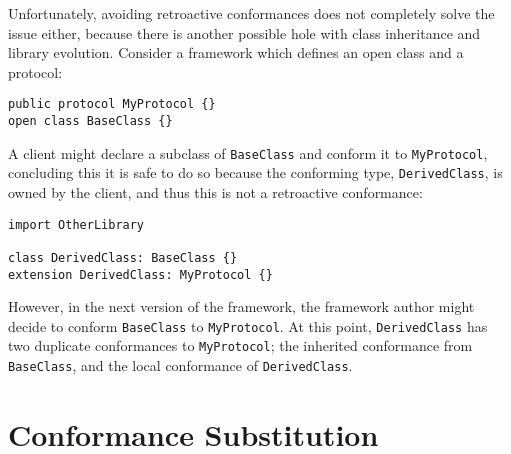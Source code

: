 \documentclass[../generics]{subfiles}
\begin{document}
Unfortunately, avoiding retroactive conformances does not completely solve the issue either, because there is another possible hole with class inheritance and library evolution. Consider a framework which defines an open class and a protocol:
\begin{Verbatim}
public protocol MyProtocol {}
open class BaseClass {}
\end{Verbatim}
A client might declare a subclass of \texttt{BaseClass} and conform it to \texttt{MyProtocol}, concluding this it is safe to do so because the conforming type, \texttt{DerivedClass}, is owned by the client, and thus this is not a retroactive conformance:
\begin{Verbatim}
import OtherLibrary

class DerivedClass: BaseClass {}
extension DerivedClass: MyProtocol {}
\end{Verbatim}
However, in the next version of the framework, the framework author might decide to conform \texttt{BaseClass} to \texttt{MyProtocol}. At this point, \texttt{DerivedClass} has two duplicate conformances to \texttt{MyProtocol}; the inherited conformance from \texttt{BaseClass}, and the local conformance of \texttt{DerivedClass}.

\section{Conformance Substitution}\label{conformance subst}
\end{document}
